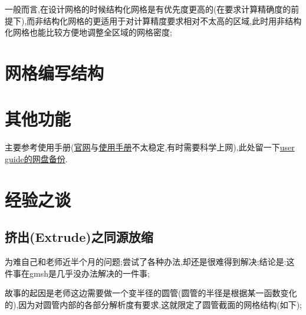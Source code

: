 一般而言,在设计网格的时候结构化网格是有优先度更高的(在要求计算精确度的前提下),而非结构化网格的更适用于对计算精度要求相对不太高的区域,此时用非结构化网格也能比较方便地调整全区域的网格密度;


\section{网格编写结构}


\section{其他功能}
主要参考使用手册(\href{http://www.gmsh.info/}{官网}与\href{http://www.gmsh.info/doc/texinfo/gmsh.pdf}{使用手册}不太稳定,有时需要科学上网),此处留一下\href{https://pan.baidu.com/s/1hVDkBt3uSOtySKSuZL6QDg?pwd=510u}{user guide的网盘备份}.




\section{经验之谈}

\subsection{挤出(Extrude)之同源放缩} \label{DishomoExtrude}

为难自己和老师近半个月的问题;尝试了各种办法,却还是很难得到解决;结论是:这件事在gmsh是几乎没办法解决的一件事;\par
故事的起因是老师这边需要做一个变半径的圆管(圆管的半径是根据某一函数变化的),因为对圆管内部的各部分解析度有要求,这就限定了圆管截面的网格结构(如下);\\


